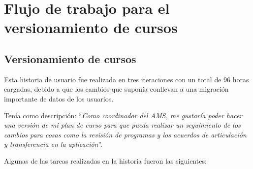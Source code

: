 \section{Flujo de trabajo para el versionamiento de cursos}
\begin{table}[H]
\centering
{}
\caption{Historias de usuario para el flujo de trabajo para el versionamiento de cursos}
\label{epic:6}
\end{table}


\subsection{Versionamiento de cursos}
Esta historia de usuario fue realizada en tres iteraciones con un total de 96 horas cargadas, debido a que los cambios que suponía conllevan a una migración importante de datos de los usuarios.

Tenía como descripción: \enquote{\textit{Como coordinador del AMS, me gustaría poder hacer una versión de mi plan de curso para que pueda realizar un seguimiento de los cambios para cosas como la revisión de programas y los acuerdos de articulación y transferencia en la aplicación}}.

Algunas de las tareas realizadas en la historia fueron las siguientes:

